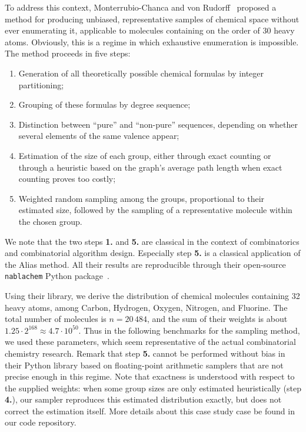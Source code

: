 To address this context, Monterrubio-Chanca and von Rudorff~\cite{MR25}
proposed a method for producing unbiased, representative samples of
chemical space without ever enumerating it, applicable to molecules containing
on the order of 30 heavy atoms. Obviously, this is a regime in which exhaustive enumeration is
impossible. The method proceeds in five steps:
\begin{enumerate}
  \item Generation of all theoretically possible chemical formulas by
    integer partitioning; %
  \item Grouping of these formulas by degree sequence;
  \item Distinction between ``pure'' and ``non-pure'' sequences, depending
    on whether several elements of the same valence appear;
  \item Estimation of the size of each group, either through exact
    counting or through a heuristic based on the graph's average path length when
    exact counting proves too costly;
  \item Weighted random sampling among the groups, proportional to their
    estimated size, followed by the sampling of a representative molecule
    within the chosen group.
\end{enumerate}
We note that the two steps \textbf{1.} and \textbf{5.} are classical in the context of combinatorics and combinatorial
algorithm design. Especially step \textbf{5.} is a classical application of the Alias method.
All their results are reproducible through their open-source \texttt{nablachem} Python
package~\cite{nablachem}.

Using their library, we derive the distribution of chemical molecules containing 32 heavy atoms, among Carbon, Hydrogen, Oxygen, Nitrogen, and Fluorine. The total number of molecules is $n = 20\,484$, and the sum of their weights is about $1.25 \cdot 2^{168} \approx 4.7 \cdot 10^{50}$. Thus in the following benchmarks for the sampling method, we used these parameters, which seem representative of the actual combinatorial chemistry research. Remark that step \textbf{5.} cannot be performed without bias in their Python library based on floating-point arithmetic samplers that are not precise enough in this regime. Note that exactness is
understood with respect to the supplied weights: when some group sizes are only estimated heuristically
(step \textbf{4.}), our sampler reproduces this estimated distribution exactly, but does not correct the
estimation itself. More details about this case study case be found in our code repository.


